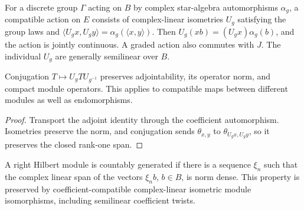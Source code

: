 \begin{definition}\label{def:compatible-module-actions}
\leanok
For a discrete group $\Gamma$ acting on $B$ by complex star-algebra
automorphisms $\alpha_g$, a compatible action on $E$ consists of
complex-linear isometries $U_g$ satisfying the group laws and
$\langle U_gx,U_gy\rangle=\alpha_g(\langle x,y\rangle)$.
Then $U_g(xb)=(U_gx)\alpha_g(b)$, and the action is jointly continuous.
A graded action also commutes with $J$. The individual $U_g$ are generally
semilinear over $B$.
\end{definition}

\begin{proposition}\label{prop:equivariant-compact-conjugation}
\leanok
Conjugation $T\mapsto U_gTU_{g^{-1}}$ preserves adjointability, its operator
norm, and compact module operators. This applies to compatible maps between
different modules as well as endomorphisms.
\end{proposition}
\begin{proof}\leanok
Transport the adjoint identity through the coefficient automorphism.
Isometries preserve the norm, and conjugation sends $\theta_{x,y}$ to
$\theta_{U_gx,U_gy}$, so it preserves the closed rank-one span.
\end{proof}

\begin{definition}\label{def:countably-generated-module}
\leanok
A right Hilbert module is countably generated if there is a sequence $\xi_n$
such that the complex linear span of the vectors $\xi_n b$, $b\in B$, is norm
dense. This property is preserved by coefficient-compatible complex-linear
isometric module isomorphisms, including semilinear coefficient twists.
\end{definition}

